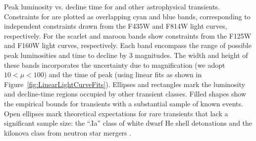 \label{fig:PeakLuminosityDeclineTimeWide}
Peak luminosity vs. decline time for \spock and other astrophysical
transients.  Constraints for \spockone are plotted as overlapping cyan
and blue bands, corresponding to independent constraints drawn from
the F435W and F814W light curves, respectively.  For \spocktwo the
scarlet and maroon bands show constraints from the F125W and F160W
light curves, respectively.  Each band encompass the range of possible
peak luminosities and time to decline by 3 magnitudes. The width and
height of these bands incorporates the uncertainty due to
magnification (we adopt $10<\mu<100$) and the time of peak (using
linear fits as shown in Figure~\ref{fig:LinearLightCurveFits}).
Ellipses and rectangles mark the luminosity and decline-time regions
occupied by other transient classes.  Filled shapes show the empirical
bounds for transients with a substantial sample of known events. Open
ellipses mark theoretical expectations for rare transients that lack a
significant sample size: the ``.Ia'' class of white dwarf He shell
detonations \citep{Bildsten:2007,Shen:2010} and the kilonova class
from neutron star
mergers \citep{Li:1998,Kulkarni:2005,Kasen:2015}.
